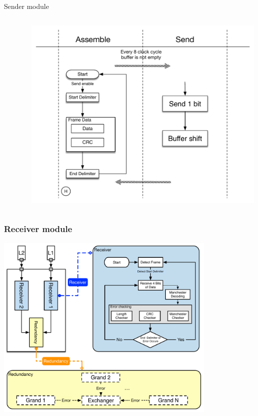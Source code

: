 \documentclass[12pt,beamer]{beamer}
\begin{document}
\begin{frame}{Sender module}
\begin{columns}
\begin{column}{.25\textwidth}
\begin{figure}
	\end{figure}
	\end{column}
	\begin{column}{.8\textwidth}
	\includegraphics[width=\textwidth]{pic/sender.pdf}
	\end{column}
\end{columns}

\end{frame}


\begin{frame}
\frametitle{Receiver module}
\centering
\includegraphics[width=0.8\textwidth]{pic/Receiver.pdf}
\end{frame}
\end{document}
